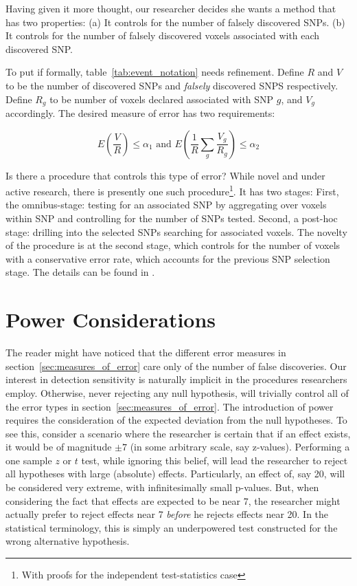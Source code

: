 \documentclass[review,12pt]{article}
\begin{document}
Having given it more thought, our researcher decides she wants a method that has two properties: 
(a) It controls for the number of falsely discovered SNPs. 
(b) It controls for the number of falsely discovered voxels associated with each discovered SNP. 

To put if formally, table~\ref{tab:event_notation} needs refinement. 
Define $R$ and $V$ to be the number of discovered SNPs and \emph{falsely} discovered SNPS respectively. 
Define $R_g$ to be number of voxels declared associated with SNP $g$, and $V_g$ accordingly. The desired measure of error has two requirements: 

\begin{equation} \label{eq:hirarchial_error}
 E \left(\frac{V}{R} \right)\leq \alpha_1 
\text{ and } 
E \left( \frac{1}{R}\sum_{g} \frac{V_{g}}{R_{g}} \right)\leq \alpha_2
\end{equation}


Is there a procedure that controls this type of error? While novel and under active research, there is presently one such procedure\footnote{With proofs for the independent test-statistics case}. It has two stages: 
First, the omnibus-stage:  testing for an associated SNP by aggregating over voxels within SNP and controlling for the number of SNPs tested. Second, a post-hoc stage: drilling into the selected SNPs searching for associated voxels. The novelty of the procedure is at the second stage, which controls for the number of voxels with a conservative error rate, which accounts for the previous SNP selection stage. 
The details can be found in \citet{benjamini_adjusting_2011}.




\section{\label{sec:power}Power Considerations}

The reader might have noticed that the different error measures in section~\ref{sec:measures_of_error} care only of the number of false discoveries. Our interest in detection sensitivity is naturally implicit in the procedures researchers employ. Otherwise, never rejecting any null hypothesis, will trivially control all of the error types in section~\ref{sec:measures_of_error}. 
The introduction of power requires the consideration of the expected deviation from the null hypotheses. To see this, consider a scenario where the researcher is certain that if an effect exists, it would be of magnitude $\pm 7$ (in some arbitrary scale, say z-values). Performing a one sample $z$ or $t$ test, while ignoring this belief, will lead the researcher to reject all hypotheses with large (absolute) effects. Particularly, an effect of, say 20,  will be considered very extreme, with infinitesimally small p-values. But, when considering the fact that effects are expected to be near 7, the researcher might actually prefer to reject effects near 7 \emph{before} he rejects effects near 20. In the statistical terminology, this is simply an underpowered test constructed for the wrong alternative hypothesis. 
\end{document}
